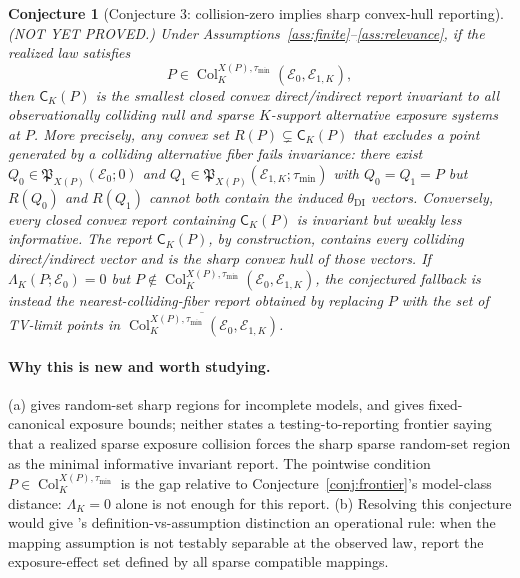 \documentclass[11pt]{article}
\theoremstyle{definition}
\theoremstyle{plain}
\newtheorem{conjecture}{Conjecture}
\theoremstyle{remark}
\begin{document}
\begin{conjecture}[Conjecture 3: collision-zero implies sharp convex-hull reporting]\label{conj:sharp-fallback}
(NOT YET PROVED.)  Under Assumptions~\ref{ass:finite}--\ref{ass:relevance}, if the realized law satisfies
\[
P\in\operatorname{Col}_{K}^{X(P),\tau_{\min}}(\mathcal E_0,\mathcal E_{1,K}),
\]
then \(\mathsf C_K(P)\) is the smallest closed convex direct/indirect report invariant to all observationally colliding null and sparse \(K\)-support alternative exposure systems at \(P\).  More precisely, any convex set \(R(P)\subsetneq \mathsf C_K(P)\) that excludes a point generated by a colliding alternative fiber fails invariance: there exist \(Q_0\in\mathfrak P_{X(P)}(\mathcal E_0;0)\) and \(Q_1\in\mathfrak P_{X(P)}(\mathcal E_{1,K};\tau_{\min})\) with \(Q_0=Q_1=P\) but \(R(Q_0)\) and \(R(Q_1)\) cannot both contain the induced \(\theta_{\mathrm{DI}}\) vectors.  Conversely, every closed convex report containing \(\mathsf C_K(P)\) is invariant but weakly less informative.  The report \(\mathsf C_K(P)\), by construction, contains every colliding direct/indirect vector and is the sharp convex hull of those vectors.  If \(\Lambda_K(P;\mathcal E_0)=0\) but \(P\notin\operatorname{Col}_{K}^{X(P),\tau_{\min}}(\mathcal E_0,\mathcal E_{1,K})\), the conjectured fallback is instead the nearest-colliding-fiber report obtained by replacing \(P\) with the set of TV-limit points in \(\overline{\operatorname{Col}_{K}^{X(P),\tau_{\min}}(\mathcal E_0,\mathcal E_{1,K})}\).
\end{conjecture}
\paragraph{Why this is new and worth studying.}
(a) \citet[Theorems~2.1--2.2]{BeresteanuMolchanovMolinari2011} gives random-set sharp regions for incomplete models, and \citet{SchroderOprescuFeuerriegelKallus2026} gives fixed-canonical exposure bounds; neither states a testing-to-reporting frontier saying that a realized sparse exposure collision forces the sharp sparse random-set region as the minimal informative invariant report.  The pointwise condition \(P\in\operatorname{Col}_{K}^{X(P),\tau_{\min}}\) is the gap relative to Conjecture~\ref{conj:frontier}'s model-class distance: \(\Lambda_K=0\) alone is not enough for this report.  (b) Resolving this conjecture would give \citet{Savje2024}'s definition-vs-assumption distinction an operational rule: when the mapping assumption is not testably separable at the observed law, report the exposure-effect set defined by all sparse compatible mappings.
\end{document}
